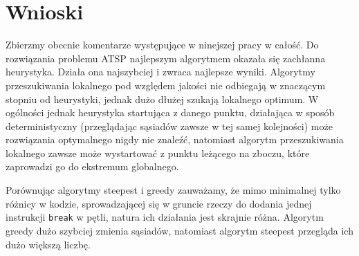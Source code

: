 \section{Wnioski}
Zbierzmy obecnie komentarze występujące w ninejszej pracy w całość. Do rozwiązania problemu ATSP najlepszym algorytmem okazała się zachłanna heurystyka. Działa ona najszybciej i zwraca najlepsze wyniki. Algorytmy przeszukiwania lokalnego pod względem jakości nie odbiegają w znaczącym stopniu od heurystyki, jednak dużo dłużej szukają lokalnego optimum. W ogólności jednak heurystyka startująca z danego punktu, działająca w sposób deterministyczny (przeglądając sąsiadów zawsze w tej samej kolejności) może rozwiązania optymalnego nigdy nie znaleźć, natomiast algorytm przeszukiwania lokalnego zawsze może wystartować z punktu leżącego na zboczu, które zaprowadzi go do ekstremum globalnego.

Porównując algorytmy steepest i greedy zauważamy, że mimo minimalnej tylko różnicy w kodzie, sprowadzającej się w gruncie rzeczy do dodania jednej instrukcji \texttt{break} w pętli, natura ich działania jest skrajnie różna. Algorytm greedy dużo szybciej zmienia sąsiadów, natomiast algorytm steepest przegląda ich dużo większą liczbę.